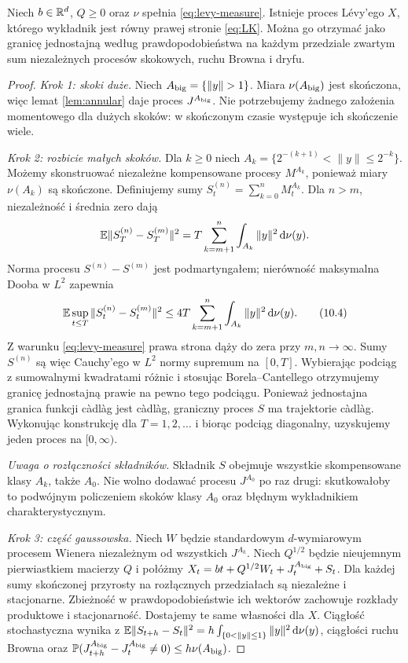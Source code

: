 \begin{twierdzenie}
\label{th:triplet-construction}
Niech $b\in\mathbb{R}^d$, $Q\ge0$ oraz $\nu$ spełnia
\eqref{eq:levy-measure}. Istnieje proces Lévy'ego
$X$, którego wykładnik jest równy prawej stronie
\eqref{eq:LK}. Można go otrzymać jako granicę
jednostajną według prawdopodobieństwa na każdym
przedziale zwartym sum niezależnych procesów skokowych,
ruchu Browna i dryfu.
\end{twierdzenie}
\begin{proof}
\emph{Krok 1: skoki duże.} Niech $A_{\rm big}=\{\|y\|>1\}$.
Miara $\nu(A_{\rm big})$ jest skończona, więc lemat
\ref{lem:annular} daje proces $J^{A_{\rm big}}$. Nie potrzebujemy
żadnego założenia momentowego dla dużych skoków:
w skończonym czasie występuje ich skończenie wiele.

\emph{Krok 2: rozbicie małych skoków.} Dla $k\ge0$ niech
$A_k=\{2^{-(k+1)}<\|y\|\le2^{-k}\}$.
Możemy skonstruować niezależne kompensowane procesy
$M^{A_k}$, ponieważ miary $\nu(A_k)$ są skończone.
Definiujemy sumy $S_t^{(n)}=\sum_{k=0}^n M_t^{A_k}$.
Dla $n>m$, niezależność i średnia zero dają
\[
\mathbb{E}\|S_T^{(n)}-S_T^{(m)}\|^2
=T\sum_{k=m+1}^n\int_{A_k}\|y\|^2\,\mathrm{d}\nu(y).
\]
Norma procesu $S^{(n)}-S^{(m)}$ jest podmartyngałem;
nierówność maksymalna Dooba w $L^2$ zapewnia
\[
\mathbb{E}\sup_{t\le T}\|S_t^{(n)}-S_t^{(m)}\|^2
\le4T\sum_{k=m+1}^n\int_{A_k}\|y\|^2\,\mathrm{d}\nu(y).
\tag{10.4}\label{eq:levy-l2-sup}
\]
Z warunku \eqref{eq:levy-measure} prawa strona dąży
do zera przy $m,n\to\infty$. Sumy $S^{(n)}$
są więc Cauchy'ego w $L^2$ normy supremum na
$[0,T]$. Wybierając podciąg z sumowalnymi kwadratami
różnic i stosując Borela--Cantellego otrzymujemy
granicę jednostajną prawie na pewno tego podciągu.
Ponieważ jednostajna granica funkcji càdlàg jest càdlàg,
graniczny proces $S$ ma trajektorie càdlàg.
Wykonując konstrukcję dla $T=1,2,\ldots$ i biorąc podciąg
diagonalny, uzyskujemy jeden proces na $[0,\infty)$.

\emph{Uwaga o rozłączności składników.} Składnik $S$ obejmuje
wszystkie skompensowane klasy $A_k$, także $A_0$.
Nie wolno dodawać procesu $J^{A_0}$ po raz drugi: skutkowałoby
to podwójnym policzeniem skoków klasy $A_0$ oraz błędnym
wykładnikiem charakterystycznym.

\emph{Krok 3: część gaussowska.} Niech $W$ będzie
standardowym $d$-wymiarowym procesem Wienera
niezależnym od wszystkich $J^{A_k}$. Niech $Q^{1/2}$
będzie nieujemnym pierwiastkiem macierzy $Q$ i połóżmy
$X_t=bt+Q^{1/2}W_t+J_t^{A_{\rm big}}+S_t$.
Dla każdej sumy skończonej przyrosty na rozłącznych
przedziałach są niezależne i stacjonarne. Zbieżność w
prawdopodobieństwie ich wektorów zachowuje rozkłady
produktowe i stacjonarność. Dostajemy te same własności
dla $X$. Ciągłość stochastyczna wynika z
$\mathbb{E}\|S_{t+h}-S_t\|^2
=h\int_{\{0<\|y\|\le1\}}\|y\|^2\,\mathrm{d}\nu(y)$,
ciągłości ruchu Browna oraz
$\mathbb{P}(J_{t+h}^{A_{\rm big}}-J_t^{A_{\rm big}}\ne0)\le h\nu(A_{\rm big})$.


\end{proof}
